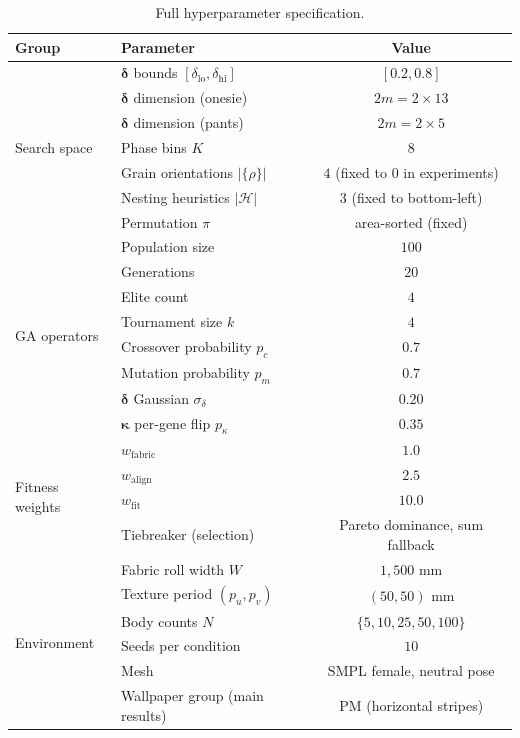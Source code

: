 \documentclass[runningheads]{llncs}
\begin{document}
\begin{table}[h]
\centering
\caption{Full hyperparameter specification.}
\label{tab:hyperparams}
\setlength{\tabcolsep}{5pt}
\begin{tabular}{llc}
\toprule
Group & Parameter & Value \\
\midrule
\multirow{7}{*}{Search space}
 & $\boldsymbol{\delta}$ bounds  $[\delta_\text{lo}, \delta_\text{hi}]$ & $[0.2, 0.8]$ \\
 & $\boldsymbol{\delta}$ dimension (onesie) & $2m = 2 \times 13$ \\
 & $\boldsymbol{\delta}$ dimension (pants)  & $2m = 2 \times 5$ \\
 & Phase bins $K$                           & $8$ \\
 & Grain orientations $|\{\rho\}|$          & $4$ (fixed to $0$ in experiments) \\
 & Nesting heuristics $|\mathcal{H}|$       & $3$ (fixed to bottom-left) \\
 & Permutation $\pi$                        & area-sorted (fixed) \\
\midrule
\multirow{8}{*}{GA operators}
 & Population size                          & $100$ \\
 & Generations                              & $20$ \\
 & Elite count                              & $4$ \\
 & Tournament size $k$                      & $4$ \\
 & Crossover probability $p_c$              & $0.7$ \\
 & Mutation probability $p_m$               & $0.7$ \\
 & $\boldsymbol{\delta}$ Gaussian $\sigma_\delta$ & $0.20$ \\
 & $\boldsymbol{\kappa}$ per-gene flip $p_\kappa$ & $0.35$ \\
\midrule
\multirow{4}{*}{Fitness weights}
 & $w_\text{fabric}$                        & $1.0$ \\
 & $w_\text{align}$                         & $2.5$ \\
 & $w_\text{fit}$                           & $10.0$ \\
 & Tiebreaker (selection)                   & Pareto dominance, sum fallback \\
\midrule
\multirow{6}{*}{Environment}
 & Fabric roll width $W$                    & $1{,}500$ mm \\
 & Texture period $(p_u, p_v)$              & $(50, 50)$ mm \\
 & Body counts $N$                          & $\{5, 10, 25, 50, 100\}$ \\
 & Seeds per condition                      & $10$ \\
 & Mesh                                     & SMPL female, neutral pose \\
 & Wallpaper group (main results)           & PM (horizontal stripes) \\
\bottomrule
\end{tabular}
\end{table}
\end{document}

